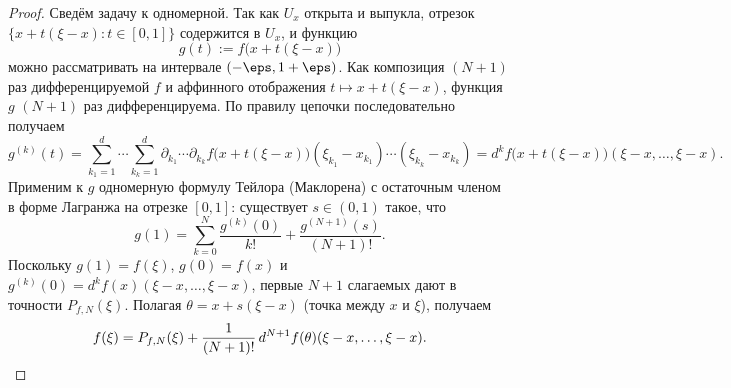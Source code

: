 \begin{proof}
	Сведём задачу к одномерной. Так как $U_x$ открыта и выпукла, отрезок
	$\{x+t(\xi-x):t\in[0,1]\}$ содержится в $U_x$, и функцию
	\[
	g(t):=f\bigl(x+t(\xi-x)\bigr)
	\]
	можно рассматривать на интервале $(-\eps,1+\eps)$. Как композиция $(N+1)$ раз
	дифференцируемой $f$ и аффинного отображения $t\mapsto x+t(\xi-x)$, функция $g$
	$(N+1)$ раз дифференцируема. По правилу цепочки последовательно получаем
	\[
	g^{(k)}(t)=\sum_{k_1=1}^d\cdots\sum_{k_k=1}^d
	\partial_{k_1}\cdots\partial_{k_k} f\bigl(x+t(\xi-x)\bigr)
	(\xi_{k_1}-x_{k_1})\cdots(\xi_{k_k}-x_{k_k})
	=d^k f\bigl(x+t(\xi-x)\bigr)(\xi-x,\dots,\xi-x).
	\]
	Применим к $g$ одномерную формулу Тейлора (Маклорена) с остаточным членом в форме
	Лагранжа на отрезке $[0,1]$: существует $s\in(0,1)$ такое, что
	\[
	g(1)=\sum_{k=0}^{N}\frac{g^{(k)}(0)}{k!}+\frac{g^{(N+1)}(s)}{(N+1)!}.
	\]
	Поскольку $g(1)=f(\xi)$, $g(0)=f(x)$ и $g^{(k)}(0)=d^k f(x)(\xi-x,\dots,\xi-x)$,
	первые $N+1$ слагаемых дают в точности $P_{f,N}(\xi)$. Полагая
	$\theta=x+s(\xi-x)$ (точка между $x$ и $\xi$), получаем
	\[
	f(\xi)=P_{f,N}(\xi)+\frac{1}{(N+1)!}\,d^{N+1}f(\theta)(\xi-x,\dots,\xi-x).\qedhere
	\]
\end{proof}
